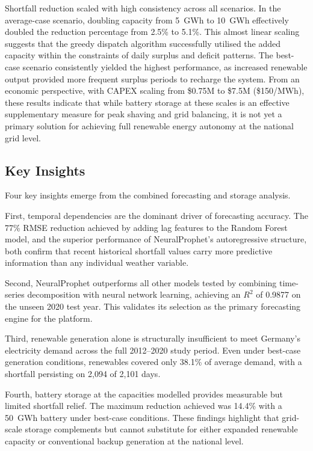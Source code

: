 \documentclass[conference]{IEEEtran}
\begin{document}
Shortfall reduction scaled with high consistency across all scenarios. In the average-case scenario, doubling capacity from 5~GWh to 10~GWh effectively doubled the reduction percentage from 2.5\% to 5.1\%. This almost linear scaling suggests that the greedy dispatch algorithm successfully utilised the added capacity within the constraints of daily surplus and deficit patterns. The best-case scenario consistently yielded the highest performance, as increased renewable output provided more frequent surplus periods to recharge the system. From an economic perspective, with CAPEX scaling from \$0.75M to \$7.5M (\$150/MWh), these results indicate that while battery storage at these scales is an effective supplementary measure for peak shaving and grid balancing, it is not yet a primary solution for achieving full renewable energy autonomy at the national grid level.
 
\subsection{Key Insights}
 
Four key insights emerge from the combined forecasting and storage analysis.
 
First, temporal dependencies are the dominant driver of forecasting accuracy. The 77\% RMSE reduction achieved by adding lag features to the Random Forest model, and the superior performance of NeuralProphet's autoregressive structure, both confirm that recent historical shortfall values carry more predictive information than any individual weather variable.
 
Second, NeuralProphet outperforms all other models tested by combining time-series decomposition with neural network learning, achieving an \(R^2\) of 0.9877 on the unseen 2020 test year. This validates its selection as the primary forecasting engine for the platform.
 
Third, renewable generation alone is structurally insufficient to meet Germany's electricity demand across the full 2012--2020 study period. Even under best-case generation conditions, renewables covered only 38.1\% of average demand, with a shortfall persisting on 2{,}094 of 2{,}101 days.
 
Fourth, battery storage at the capacities modelled provides measurable but limited shortfall relief. The maximum reduction achieved was 14.4\% with a 50~GWh battery under best-case conditions. These findings highlight that grid-scale storage complements but cannot substitute for either expanded renewable capacity or conventional backup generation at the national level.
 
\end{document}
